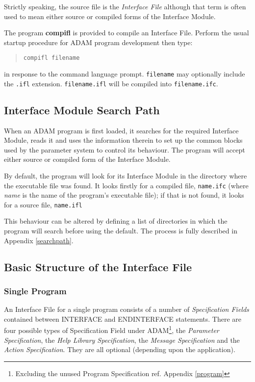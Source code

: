 \documentclass[twoside,11pt]{article}
\newcommand{\xlabel}[1]{}
\renewcommand{\_}{\texttt{\symbol{95}}}
\begin{document}
Strictly speaking, the source file is the {\em Interface File} although that
term is often used to mean either source or compiled forms of the
Interface Module.

The program {\bf compifl} is provided to compile an Interface File.
Perform the usual startup procedure for ADAM program development
then type:
\begin{quote} \begin{verbatim}
compifl filename
\end{verbatim} \end{quote}
in response to the command language prompt.
\texttt{filename} may optionally include the \texttt{.ifl} extension.
\texttt{filename.ifl} will be compiled into \texttt{filename.ifc}.

\subsection{Interface Module Search Path
\xlabel{interface_module_search_path}}

When an ADAM program is first loaded, it searches for the required
Interface Module, reads it and uses the information therein to set up the
common blocks used by the parameter system to control its behaviour.
The program will accept either source or compiled form of the Interface Module.

By default, the program will look for its Interface Module in the directory
where the executable file was found. It looks firstly for a compiled file,
\texttt{name.ifc} (where {\em name} is the name of the program's executable
file); if that is not found, it looks for a source file, \texttt{name.ifl}

This behaviour can be altered by defining a list of directories in which
the program will search before using the default.
The process is fully described in Appendix \ref{searchpath}.

\subsection{Basic Structure of the Interface File
\xlabel{basic_structure_of_the_interface_file}}

\subsubsection{Single Program}

An Interface File for a single program consists of a number of {\em
Specification Fields} contained between INTERFACE and ENDINTERFACE
statements.
There are four possible types of
Specification Field under ADAM\footnote{Excluding the unused Program
Specification ref. Appendix \ref{program}}, the {\em Parameter
Specification}\/, the {\em Help Library Specification}\/, the {\em Message
Specification}\/ and the {\em Action Specification}.
They are all optional (depending upon the application).
\end{document}
